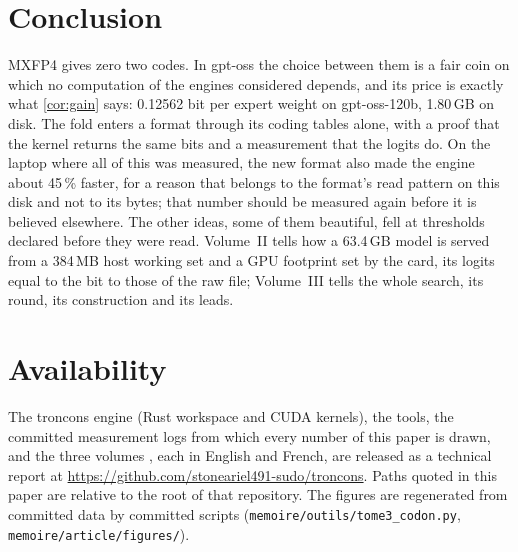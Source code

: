 \documentclass[11pt, a4paper]{article}
\theoremstyle{remark}
\newcommand{\fichier}[1]{\textsf{\footnotesize\nolinkurl{#1}}}
\newcommand{\Emplacement}{\url{https://github.com/stoneariel491-sudo/troncons}}
\begin{document}
\section{Conclusion}\label{sec:conclusion}

MXFP4 gives zero two codes. In gpt-oss the choice between them is a fair coin on which no computation of the engines considered depends, and its price is exactly what \cref{cor:gain} says: 0.12562 bit per expert weight on gpt-oss-120b, 1.80\,GB on disk. The fold enters a format through its coding tables alone, with a proof that the kernel returns the same bits and a measurement that the logits do. On the laptop where all of this was measured, the new format also made the engine about 45\,\% faster, for a reason that belongs to the format's read pattern on this disk and not to its bytes; that number should be measured again before it is believed elsewhere. The other ideas, some of them beautiful, fell at thresholds declared before they were read. Volume~II tells how a 63.4\,GB model is served from a 384\,MB host working set and a GPU footprint set by the card, its logits equal to the bit to those of the raw file; Volume~III tells the whole search, its round, its construction and its leads.

\section*{Availability}\label{sec:dispo}

The troncons engine (Rust workspace and CUDA kernels), the tools, the committed measurement logs from which every number of this paper is drawn, and the three volumes \citep{troncons-tome1,troncons-tome2,troncons-tome3}, each in English and French, are released as a technical report at \Emplacement. Paths quoted in this paper are relative to the root of that repository. The figures are regenerated from committed data by committed scripts (\fichier{memoire/outils/tome3\_codon.py}, \fichier{memoire/article/figures/}).



\end{document}
